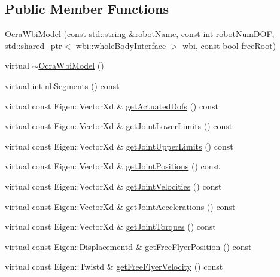\subsection*{\-Public \-Member \-Functions}
\begin{DoxyCompactItemize}
\item 
\hyperlink{classocra__icub_1_1OcraWbiModel_a57a4f0f140f56d7ec0a00b31e16f9673}{\-Ocra\-Wbi\-Model} (const std\-::string \&robot\-Name, const int robot\-Num\-D\-O\-F, std\-::shared\-\_\-ptr$<$ wbi\-::whole\-Body\-Interface $>$ wbi, const bool free\-Root)
\item 
virtual \hyperlink{classocra__icub_1_1OcraWbiModel_ade110b2e003ccd49d2baa4f56a954e4b}{$\sim$\-Ocra\-Wbi\-Model} ()
\item 
virtual int \hyperlink{classocra__icub_1_1OcraWbiModel_adf952842e3c031a5000ee37c51fe9b77}{nb\-Segments} () const 
\item 
virtual const \-Eigen\-::\-Vector\-Xd \& \hyperlink{classocra__icub_1_1OcraWbiModel_aecb11984be8a80c66b45d37f5fb992ce}{get\-Actuated\-Dofs} () const 
\item 
virtual const \-Eigen\-::\-Vector\-Xd \& \hyperlink{classocra__icub_1_1OcraWbiModel_a7eeb8088b632036c56841cee96aef7ff}{get\-Joint\-Lower\-Limits} () const 
\item 
virtual const \-Eigen\-::\-Vector\-Xd \& \hyperlink{classocra__icub_1_1OcraWbiModel_aa9303621ea64de2378780e2f5e6618b6}{get\-Joint\-Upper\-Limits} () const 
\item 
virtual const \-Eigen\-::\-Vector\-Xd \& \hyperlink{classocra__icub_1_1OcraWbiModel_adeacb1988bd5a4edfde5ec30caae2df3}{get\-Joint\-Positions} () const 
\item 
virtual const \-Eigen\-::\-Vector\-Xd \& \hyperlink{classocra__icub_1_1OcraWbiModel_a403d66cbc41b7cc5e1323c49d578e447}{get\-Joint\-Velocities} () const 
\item 
virtual const \-Eigen\-::\-Vector\-Xd \& \hyperlink{classocra__icub_1_1OcraWbiModel_ab590303004576e870219e88e92e088f8}{get\-Joint\-Accelerations} () const 
\item 
virtual const \-Eigen\-::\-Vector\-Xd \& \hyperlink{classocra__icub_1_1OcraWbiModel_a639baccfdc1ca6409e14a4839e0394fe}{get\-Joint\-Torques} () const 
\item 
virtual const \*
\-Eigen\-::\-Displacementd \& \hyperlink{classocra__icub_1_1OcraWbiModel_a3e9c4db6d1ee56984fea44cdd592a1ac}{get\-Free\-Flyer\-Position} () const 
\item 
virtual const \-Eigen\-::\-Twistd \& \hyperlink{classocra__icub_1_1OcraWbiModel_a9fbfa4c9da43f0b1957f25d8ecb792d9}{get\-Free\-Flyer\-Velocity} () const 

\end{DoxyCompactItemize}
